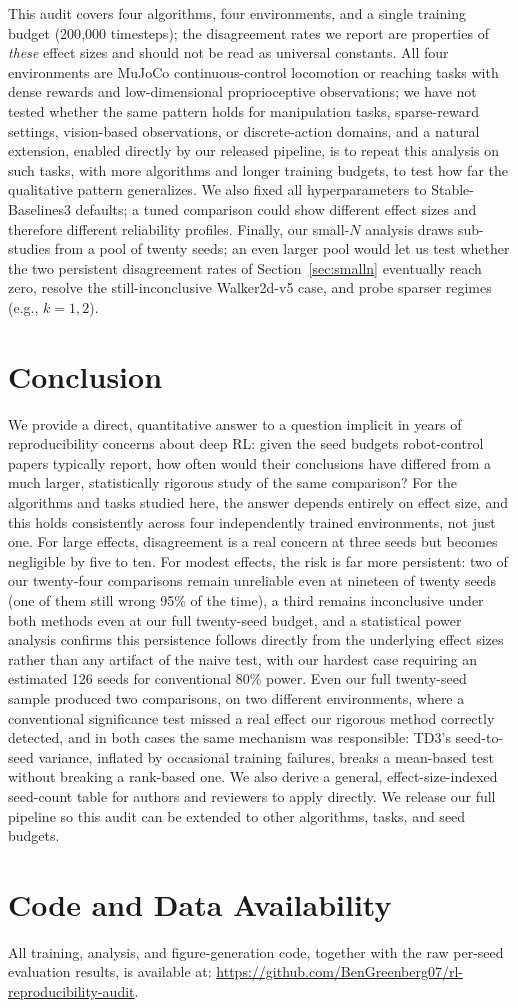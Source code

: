 \documentclass[journal]{IEEEtran}
\begin{document}
This audit covers four algorithms, four environments, and a single training budget (200{,}000
timesteps); the disagreement rates we report are properties of \emph{these} effect sizes and
should not be read as universal constants. All four environments are MuJoCo continuous-control
locomotion or reaching tasks with dense rewards and low-dimensional proprioceptive observations; we
have not tested whether the same pattern holds for manipulation tasks, sparse-reward settings,
vision-based observations, or discrete-action domains, and a natural extension, enabled directly by
our released pipeline, is to repeat this analysis on such tasks, with more algorithms and longer
training budgets, to test how far the qualitative pattern generalizes. We also fixed all
hyperparameters to Stable-Baselines3 defaults; a tuned comparison could show different effect sizes
and therefore different reliability profiles. Finally, our small-$N$ analysis draws sub-studies
from a pool of twenty seeds; an even larger pool would let us test whether the two persistent
disagreement rates of Section~\ref{sec:smalln} eventually reach zero, resolve the still-inconclusive
Walker2d-v5 case, and probe sparser regimes (e.g., $k=1,2$).

\section{Conclusion}

We provide a direct, quantitative answer to a question implicit in years of reproducibility
concerns about deep RL: given the seed budgets robot-control papers typically report, how often
would their conclusions have differed from a much larger, statistically rigorous study of the same
comparison? For the algorithms and tasks studied here, the answer depends entirely on effect size,
and this holds consistently across four independently trained environments, not just one. For
large effects, disagreement is a real concern at three seeds but becomes negligible by five to ten.
For modest effects, the risk is far more persistent: two of our twenty-four comparisons remain
unreliable even at nineteen of twenty seeds (one of them still wrong 95\% of the time), a third
remains inconclusive under both methods even at our full twenty-seed budget, and a statistical
power analysis confirms this persistence follows directly from the underlying effect sizes rather
than any artifact of the naive test, with our hardest case requiring an estimated 126 seeds for
conventional 80\% power. Even our full twenty-seed sample produced two comparisons, on two
different environments, where a conventional significance test missed a real effect our rigorous
method correctly detected, and in both cases the same mechanism was responsible: TD3's
seed-to-seed variance, inflated by occasional training failures, breaks a mean-based test without
breaking a rank-based one. We also derive a general, effect-size-indexed seed-count table for
authors and reviewers to apply directly. We release our full pipeline so this audit can be
extended to other algorithms, tasks, and seed budgets.

\section*{Code and Data Availability}
All training, analysis, and figure-generation code, together with the raw per-seed evaluation
results, is available at: \url{https://github.com/BenGreenberg07/rl-reproducibility-audit}.

{\footnotesize


}
\end{document}
